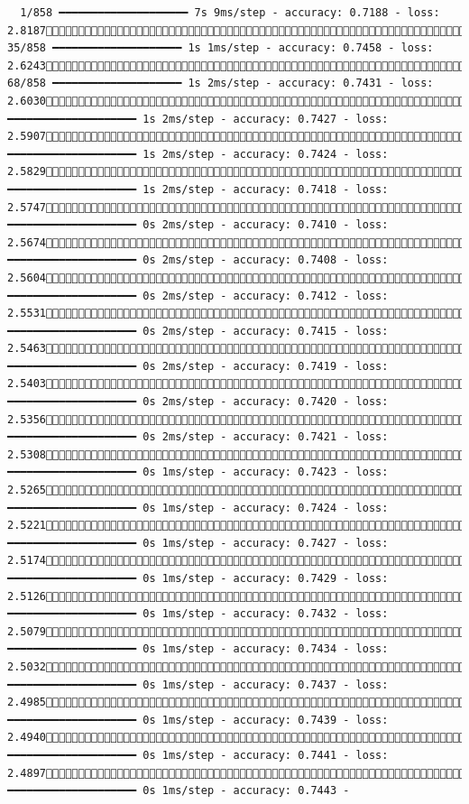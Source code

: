 \documentclass[
  letterpaper,
  DIV=11,
  numbers=noendperiod]{scrartcl}
\begin{document}
\begin{verbatim}
  1/858 ━━━━━━━━━━━━━━━━━━━━ 7s 9ms/step - accuracy: 0.7188 - loss: 2.8187 35/858 ━━━━━━━━━━━━━━━━━━━━ 1s 1ms/step - accuracy: 0.7458 - loss: 2.6243 68/858 ━━━━━━━━━━━━━━━━━━━━ 1s 2ms/step - accuracy: 0.7431 - loss: 2.6030100/858 ━━━━━━━━━━━━━━━━━━━━ 1s 2ms/step - accuracy: 0.7427 - loss: 2.5907134/858 ━━━━━━━━━━━━━━━━━━━━ 1s 2ms/step - accuracy: 0.7424 - loss: 2.5829168/858 ━━━━━━━━━━━━━━━━━━━━ 1s 2ms/step - accuracy: 0.7418 - loss: 2.5747202/858 ━━━━━━━━━━━━━━━━━━━━ 0s 2ms/step - accuracy: 0.7410 - loss: 2.5674235/858 ━━━━━━━━━━━━━━━━━━━━ 0s 2ms/step - accuracy: 0.7408 - loss: 2.5604269/858 ━━━━━━━━━━━━━━━━━━━━ 0s 2ms/step - accuracy: 0.7412 - loss: 2.5531304/858 ━━━━━━━━━━━━━━━━━━━━ 0s 2ms/step - accuracy: 0.7415 - loss: 2.5463337/858 ━━━━━━━━━━━━━━━━━━━━ 0s 2ms/step - accuracy: 0.7419 - loss: 2.5403370/858 ━━━━━━━━━━━━━━━━━━━━ 0s 2ms/step - accuracy: 0.7420 - loss: 2.5356407/858 ━━━━━━━━━━━━━━━━━━━━ 0s 2ms/step - accuracy: 0.7421 - loss: 2.5308443/858 ━━━━━━━━━━━━━━━━━━━━ 0s 1ms/step - accuracy: 0.7423 - loss: 2.5265480/858 ━━━━━━━━━━━━━━━━━━━━ 0s 1ms/step - accuracy: 0.7424 - loss: 2.5221518/858 ━━━━━━━━━━━━━━━━━━━━ 0s 1ms/step - accuracy: 0.7427 - loss: 2.5174555/858 ━━━━━━━━━━━━━━━━━━━━ 0s 1ms/step - accuracy: 0.7429 - loss: 2.5126592/858 ━━━━━━━━━━━━━━━━━━━━ 0s 1ms/step - accuracy: 0.7432 - loss: 2.5079630/858 ━━━━━━━━━━━━━━━━━━━━ 0s 1ms/step - accuracy: 0.7434 - loss: 2.5032668/858 ━━━━━━━━━━━━━━━━━━━━ 0s 1ms/step - accuracy: 0.7437 - loss: 2.4985705/858 ━━━━━━━━━━━━━━━━━━━━ 0s 1ms/step - accuracy: 0.7439 - loss: 2.4940741/858 ━━━━━━━━━━━━━━━━━━━━ 0s 1ms/step - accuracy: 0.7441 - loss: 2.4897774/858 ━━━━━━━━━━━━━━━━━━━━ 0s 1ms/step - accuracy: 0.7443 - 
\end{verbatim}
\end{document}
